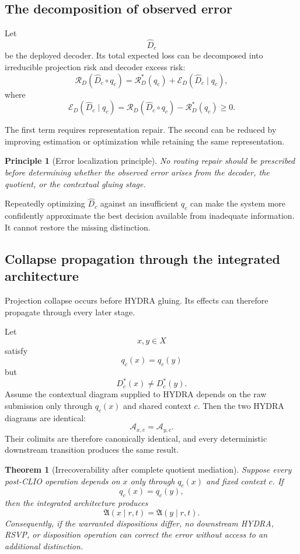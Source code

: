 \documentclass[11pt]{article}
\newtheorem{theorem}[definition]{Theorem}
\newtheorem{principle}[definition]{Principle}
\theoremstyle{definition}
\newcommand{\A}{\mathcal{A}}
\newcommand{\AC}{\mathfrak{A}}
\begin{document}
\subsection{The decomposition of observed error}

Let
\[
\widehat D_c
\]
be the deployed decoder. Its total expected loss can be decomposed into irreducible projection risk and decoder excess risk:
\[
\mathcal R_D(\widehat D_c\circ q_c)
=
\mathcal R_D^{*}(q_c)
+
\mathcal E_D(\widehat D_c\mid q_c),
\]
where
\[
\mathcal E_D(\widehat D_c\mid q_c)
=
\mathcal R_D(\widehat D_c\circ q_c)
-
\mathcal R_D^{*}(q_c)
\geq0.
\]

The first term requires representation repair. The second can be reduced by improving estimation or optimization while retaining the same representation.

\begin{principle}[Error localization principle]
No routing repair should be prescribed before determining whether the observed error arises from the decoder, the quotient, or the contextual gluing stage.
\end{principle}

Repeatedly optimizing \(\widehat D_c\) against an insufficient \(q_c\) can make the system more confidently approximate the best decision available from inadequate information. It cannot restore the missing distinction.

\subsection{Collapse propagation through the integrated architecture}

Projection collapse occurs before HYDRA gluing. Its effects can therefore propagate through every later stage.

Let
\[
x,y\in X
\]
satisfy
\[
q_c(x)=q_c(y)
\]
but
\[
D_c^{*}(x)\neq D_c^{*}(y).
\]
Assume the contextual diagram supplied to HYDRA depends on the raw submission only through \(q_c(x)\) and shared context \(c\). Then the two HYDRA diagrams are identical:
\[
\A_{x,c}
=
\A_{y,c}.
\]
Their colimits are therefore canonically identical, and every deterministic downstream transition produces the same result.

\begin{theorem}[Irrecoverability after complete quotient mediation]
Suppose every post-CLIO operation depends on \(x\) only through \(q_c(x)\) and fixed context \(c\). If
\[
q_c(x)=q_c(y),
\]
then the integrated architecture produces
\[
\AC(x\mid r,t)=\AC(y\mid r,t).
\]
Consequently, if the warranted dispositions differ, no downstream HYDRA, RSVP, or disposition operation can correct the error without access to an additional distinction.
\end{theorem}
\end{document}
